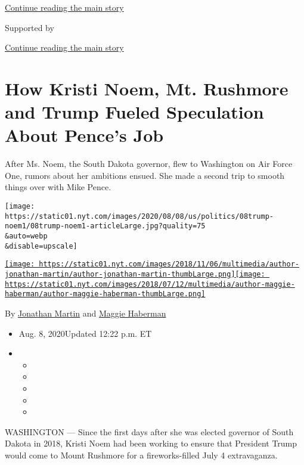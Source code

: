 \protect\hyperlink{after-top}{Continue reading the main story}

Supported by

\protect\hyperlink{after-sponsor}{Continue reading the main story}

\hypertarget{how-kristi-noem-mt-rushmore-and-trump-fueled-speculation-about-pences-job}{%
\section{How Kristi Noem, Mt. Rushmore and Trump Fueled Speculation
About Pence's
Job}\label{how-kristi-noem-mt-rushmore-and-trump-fueled-speculation-about-pences-job}}

After Ms. Noem, the South Dakota governor, flew to Washington on Air
Force One, rumors about her ambitions ensued. She made a second trip to
smooth things over with Mike Pence.

\texttt{[image: https://static01.nyt.com/images/2020/08/08/us/politics/08trump-noem1/08trump-noem1-articleLarge.jpg?quality=75\\\&auto=webp\\\&disable=upscale]}

\href{https://www.nytimes.com/by/jonathan-martin}{\texttt{[image: https://static01.nyt.com/images/2018/11/06/multimedia/author-jonathan-martin/author-jonathan-martin-thumbLarge.png]}}\href{https://www.nytimes.com/by/maggie-haberman}{\texttt{[image: https://static01.nyt.com/images/2018/07/12/multimedia/author-maggie-haberman/author-maggie-haberman-thumbLarge.png]}}

By \href{https://www.nytimes.com/by/jonathan-martin}{Jonathan Martin}
and \href{https://www.nytimes.com/by/maggie-haberman}{Maggie Haberman}

\begin{itemize}
\item
  Aug. 8, 2020Updated 12:22 p.m. ET
\item
  \begin{itemize}
  \item
  \item
  \item
  \item
  \item
  \end{itemize}
\end{itemize}

WASHINGTON --- Since the first days after she was elected governor of
South Dakota in 2018, Kristi Noem had been working to ensure that
President Trump would come to Mount Rushmore for a fireworks-filled July
4 extravaganza.

